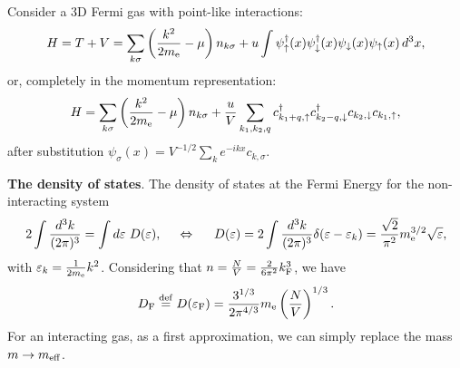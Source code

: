 Consider a 3D Fermi gas with point-like interactions:
\begin{equation*}
	H = T + V = \sum_{k \sigma} \left(
		\frac{k^2}{2m_{\textnormal{e}}}-\mu
	\right) n_{k \sigma} + u 
	\int \psi^{\dag}_{\uparrow} (x) \psi^{\dag}_{\downarrow} (x) \psi_{\downarrow} (x) \psi_{\uparrow} (x) \, d^3 x,
\end{equation*}
or, completely in the momentum representation:
\begin{equation*}
	H = \sum_{k \sigma} \left(
		\frac{k^2}{2m_{\textnormal{e}}}-\mu
	\right) n_{k \sigma} + \frac{u}{V}  \sum_{k_1, k_2, q} c^{\dag}_{k_1 + q, \uparrow} c^{\dag}_{k_2 - q, \downarrow} c_{k_2, \downarrow} c_{k_1, \uparrow},
\end{equation*}
after substitution $\psi_\sigma(x) = V^{-1/2} \sum_k e^{- i k x} c_{k, \sigma}$.

\textbf{The density of states}. 
The density of states at the Fermi Energy for the non-interacting system
\begin{equation*}
	2 \int \frac{d^3 k}{(2\pi)^3} = \int d\varepsilon \ D(\varepsilon),
	\hspace{5 mm} 
	\Leftrightarrow
	\hspace{5 mm} 
	D(\varepsilon) = 2 \int \frac{d^3 k}{(2\pi)^3} \delta(\varepsilon - \varepsilon_k) = \frac{\sqrt{2}}{\pi^2} m_{\textnormal{e}}^{3/2} \sqrt{\varepsilon},
\end{equation*}
with $\varepsilon_k = \frac{1}{2m_{\textnormal{e}}}k^2$. Considering that $n = \frac{N}{V} = \frac{2}{6 \pi^2} k_{\textnormal{F}}^3$, we have
\begin{equation*}
	D_{\textnormal{F}} \overset{\mathrm{def}}{=} D(\varepsilon_{\textnormal{F}})  = \frac{3^{1/3}}{2\pi^{4/3}} m_{\textnormal{e}} \left(\frac{N}{V}\right)^{1/3}.
\end{equation*}
For an interacting gas, as a first approximation, we can simply replace the mass $m \to m_{\textnormal{eff}}$.

